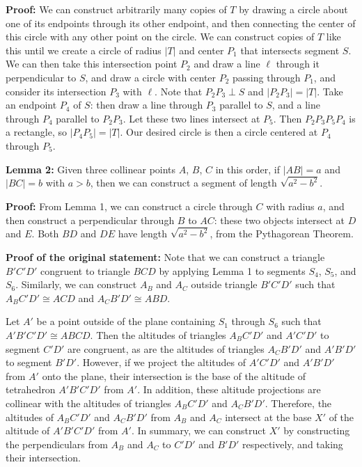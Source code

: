 \begin{enumerate}
 \textbf{Proof:} We can construct arbitrarily many copies of $T$ by drawing a circle about one of its endpoints through its other endpoint, and then connecting the center of this circle with any other point on the circle. We can construct copies of $T$ like this until we create a circle of radius $|T|$ and center $P_1$ that intersects segment $S$. We can then take this intersection point $P_2$ and draw a line $\ell$ through it perpendicular to $S$, and draw a circle with center $P_2$ passing through $P_1$, and consider its intersection $P_3$ with $\ell$. Note that $P_2P_3\perp S$ and $|P_2P_3|=|T|$. Take an endpoint $P_4$ of $S$: then draw a line through $P_3$ parallel to $S$, and a line through $P_4$ parallel to $P_2P_3$. Let these two lines intersect at $P_5$. Then $P_2P_3P_5P_4$ is a rectangle, so $|P_4P_5|=|T|$. Our desired circle is then a circle centered at $P_4$ through $P_5$.

 \textbf{Lemma 2:} Given three collinear points $A$, $B$, $C$ in this order, if $|AB|=a$ and $|BC|=b$ with $a>b$, then we can construct a segment of length $\sqrt{a^2-b^2}$.

 \textbf{Proof:} From Lemma 1, we can construct a circle through $C$ with radius $a$, and then construct a perpendicular through $B$ to $AC$: these two objects intersect at $D$ and $E$. Both $BD$ and $DE$ have length $\sqrt{a^2-b^2}$, from the Pythagorean Theorem.

 \textbf{Proof of the original statement:} Note that we can construct a triangle $B'C'D'$ congruent to triangle $BCD$ by applying Lemma 1 to segments $S_4$, $S_5$, and $S_6$. Similarly, we can construct $A_B$ and $A_C$ outside triangle $B'C'D'$ such that $A_BC'D'\cong ACD$ and $A_CB'D'\cong ABD$.

 Let $A'$ be a point outside of the plane containing $S_1$ through $S_6$ such that $A'B'C'D'\cong ABCD$. Then the altitudes of triangles $A_BC'D'$ and $A'C'D'$ to segment $C'D'$ are congruent, as are the altitudes of triangles $A_CB'D'$ and $A'B'D'$ to segment $B'D'$. However, if we project the altitudes of $A'C'D'$ and $A'B'D'$ from $A'$ onto the plane, their intersection is the base of the altitude of tetrahedron $A'B'C'D'$ from $A'$. In addition, these altitude projections are collinear with the altitudes of triangles $A_BC'D'$ and $A_CB'D'$. Therefore, the altitudes of $A_BC'D'$ and $A_CB'D'$ from $A_B$ and $A_C$ intersect at the base $X'$ of the altitude of $A'B'C'D'$ from $A'$. In summary, we can construct $X'$ by constructing the perpendiculars from $A_B$ and $A_C$ to $C'D'$ and $B'D'$ respectively, and taking their intersection.


\end{enumerate}
